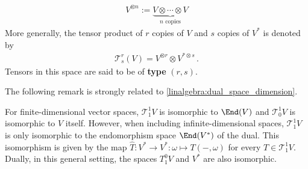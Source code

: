     \begin{notation}\label{vector:type}
        \begin{gather}
            V^{\otimes n} := \underbrace{V\otimes\cdots\otimes V}_{n\text{ copies}}
        \end{gather}
        More generally, the tensor product of $r$ copies of $V$ and $s$ copies of $V^*$ is denoted by
        \begin{gather}
            \mathcal{T}^r_s(V) = V^{\otimes r}\otimes V^{*\otimes s}\,.
        \end{gather}
        Tensors in this space are said to be of \textbf{type} $(r,s)$.
    \end{notation}


    The following remark is strongly related to \cref{linalgebra:dual_space_dimension}.
    \begin{remark}
        For finite-dimensional vector spaces, $\mathcal{T}^1_1V$ is isomorphic to $\End(V)$ and $\mathcal{T}^1_0V$ is isomorphic to $V$ itself. However, when including infinite-dimensional spaces, $\mathcal{T}^1_1V$ is only isomorphic to the endomorphism space $\End(V^*)$ of the dual. This isomorphism is given by the map $\hat{T}:V^*\rightarrow V^*:\omega\mapsto T(-,\omega)$ for every $T\in\mathcal{T}^1_1V$. Dually, in this general setting, the spaces $T^0_1V$ and $V^*$ are also isomorphic.
    \end{remark}

